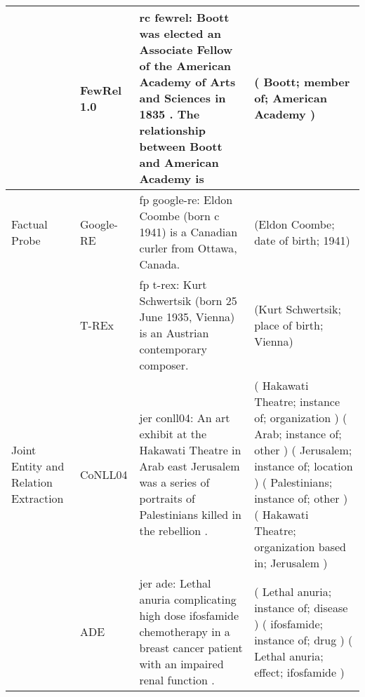 \begin{table*}[]
{\begin{tabular}{@{}p{2.7cm}lp{10.5cm}p{10.5cm}@{}}
                                                        \\
                                     & FewRel 1.0       & \quad rc fewrel: Boott was elected an Associate Fellow of the American Academy of Arts and Sciences in 1835 . The relationship between Boott and American Academy is              
                                                        &  ( Boott; {\color{blue}member of}; American Academy )               
                                                        \\ \midrule
Factual Probe                       & Google-RE        & \quad fp google-re: Eldon Coombe (born c 1941) is a Canadian curler from Ottawa, Canada.               
                                                        &  (Eldon Coombe; date of birth; {\color{orange}1941})               
                                                        \\
                                     & T-REx            & \quad fp t-rex: Kurt Schwertsik (born 25 June 1935, Vienna) is an Austrian contemporary composer.              
                                                        &  (Kurt Schwertsik; place of birth; {\color{orange}Vienna})              
                                                        \\ \midrule
Joint Entity and Relation Extraction & CoNLL04          & \quad jer conll04: An art exhibit at the {\color{black} Hakawati Theatre} in {\color{black} Arab} east {\color{black} Jerusalem} was a series of portraits of {\color{black} Palestinians} killed in the rebellion .
                                                        & ( {\color{orange} Hakawati Theatre}; instance of; {\color{orange} organization} ) ( {\color{orange} Arab}; instance of; {\color{orange} other} ) ( {\color{orange} Jerusalem}; instance of; {\color{orange} location} ) ( {\color{orange} Palestinians}; instance of; {\color{orange} other} ) ( {\color{orange} Hakawati Theatre}; {\color{blue} organization based in}; {\color{orange} Jerusalem} )
                                                        \\
                                     & ADE              & \quad jer ade: {\color{black} Lethal anuria} complicating high dose {\color{black} ifosfamide} chemotherapy in a breast cancer patient with an impaired renal function .
                                                        & ( {\color{orange} Lethal anuria}; instance of; {\color{orange} disease} ) ( {\color{orange} ifosfamide}; instance of; {\color{orange} drug} ) ( {\color{orange} Lethal anuria}; {\color{blue} effect}; {\color{orange} ifosfamide} )

\end{tabular}}
\end{table*}
